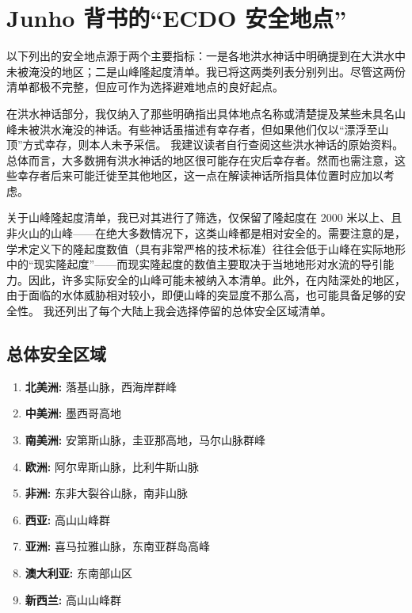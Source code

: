 \documentclass[10pt,twocolumn,letterpaper]{article}
\begin{document}
\section{Junho 背书的“ECDO 安全地点”}
以下列出的安全地点源于两个主要指标：一是各地洪水神话中明确提到在大洪水中未被淹没的地区；二是山峰隆起度清单。我已将这两类列表分别列出。尽管这两份清单都极不完整，但应可作为选择避难地点的良好起点。

在洪水神话部分，我仅纳入了那些明确指出具体地点名称或清楚提及某些未具名山峰未被洪水淹没的神话。有些神话虽描述有幸存者，但如果他们仅以“漂浮至山顶”方式幸存，则本人未予采信。 我建议读者自行查阅这些洪水神话的原始资料。总体而言，大多数拥有洪水神话的地区很可能存在灾后幸存者。然而也需注意，这些幸存者后来可能迁徙至其他地区，这一点在解读神话所指具体位置时应加以考虑。

关于山峰隆起度清单，我已对其进行了筛选，仅保留了隆起度在 2000 米以上、且非火山的山峰——在绝大多数情况下，这类山峰都是相对安全的。需要注意的是，学术定义下的隆起度数值（具有非常严格的技术标准）往往会低于山峰在实际地形中的“现实隆起度”——而现实隆起度的数值主要取决于当地地形对水流的导引能力。因此，许多实际安全的山峰可能未被纳入本清单。此外，在内陆深处的地区，由于面临的水体威胁相对较小，即便山峰的突显度不那么高，也可能具备足够的安全性。
我还列出了每个大陆上我会选择停留的总体安全区域清单。

\subsection{总体安全区域}
\begin{flushleft}
\begin{enumerate}
    \item \textbf{北美洲:} 落基山脉，西海岸群峰
    \item \textbf{中美洲:} 墨西哥高地
    \item \textbf{南美洲:} 安第斯山脉，圭亚那高地，马尔山脉群峰
    \item \textbf{欧洲:} 阿尔卑斯山脉，比利牛斯山脉
    \item \textbf{非洲:} 东非大裂谷山脉，南非山脉
    \item \textbf{西亚:} 高山山峰群
    \item \textbf{亚洲:} 喜马拉雅山脉，东南亚群岛高峰
    \item \textbf{澳大利亚:} 东南部山区
    \item \textbf{新西兰:} 高山山峰群
\end{enumerate}
\end{flushleft}

\clearpage
\twocolumn
\end{document}
